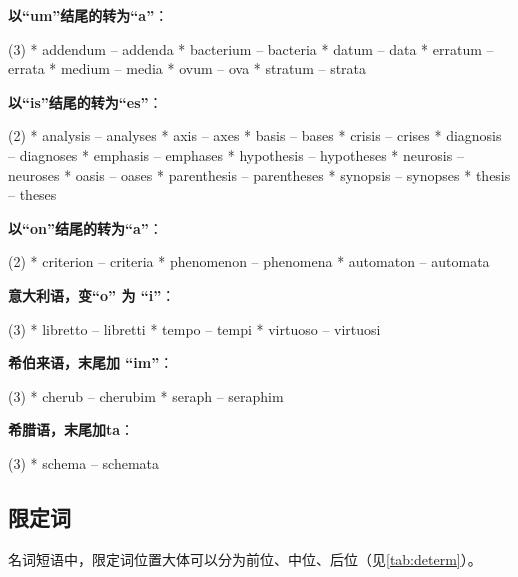 \begin{description}
  \textbf{以``um''结尾的转为``a''}：
  \begin{taskitem}(3)
    *  addendum -- addenda
    *  bacterium -- bacteria
    *  datum -- data
    *  erratum -- errata
    *  medium -- media
    *  ovum -- ova
    *  stratum -- strata
  \end{taskitem}

  \textbf{以``is''结尾的转为``es''}：
  \begin{taskitem}(2)
    *  analysis -- analyses
    *  axis -- axes
    *  basis -- bases
    *  crisis -- crises
    *  diagnosis -- diagnoses
    *  emphasis -- emphases
    *  hypothesis -- hypotheses
    *  neurosis -- neuroses
    *  oasis -- oases
    *  parenthesis -- parentheses
    *  synopsis -- synopses
    *  thesis -- theses
  \end{taskitem}


  \textbf{以``on''结尾的转为``a''}：
  \begin{taskitem}(2)
    *  criterion -- criteria
    *  phenomenon -- phenomena
    *  automaton -- automata
  \end{taskitem}


  \textbf{意大利语，变``o'' 为 ``i''}：
  \begin{taskitem}(3)
    *  libretto -- libretti
    *  tempo -- tempi
    *  virtuoso -- virtuosi
  \end{taskitem}

  \textbf{希伯来语，末尾加 ``im''}：
  \begin{taskitem}(3)
    *  cherub -- cherubim
    *  seraph -- seraphim
  \end{taskitem}

  \textbf{希腊语，末尾加ta}：
  \begin{taskitem}(3)
    *  schema -- schemata
  \end{taskitem}
\end{description}

\subsection{限定词}
\label{sub:determin}

名词短语中，限定词位置大体可以分为前位、中位、后位（见\cref{tab:determ}）。

